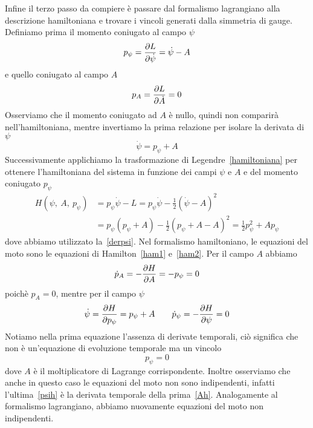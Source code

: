    Infine il terzo passo da compiere è passare dal formalismo lagrangiano alla descrizione hamiltoniana e trovare i vincoli generati dalla simmetria di gauge. Definiamo prima il momento coniugato al campo $\psi$
    \begin{equation*}
        p_\psi = \frac{\partial L}{\partial\dot \psi} = \dot \psi - A
    \end{equation*}
    e quello coniugato al campo $A$
    \begin{equation*}
        p_A = \frac{\partial L}{\partial\dot A} = 0
    \end{equation*}
    Osserviamo che il momento coniugato ad $A$ è nullo, quindi non comparirà nell'hamiltoniana, mentre invertiamo la prima relazione per isolare la derivata di $\psi$
    \begin{equation} \label{derpsi}
        \dot \psi = p_\psi + A
    \end{equation}
    Successivamente applichiamo la trasformazione di Legendre~\eqref{hamiltoniana} per ottenere l'hamiltoniana del sistema in funzione dei campi $\psi$ e $A$ e del momento coniugato $p_\psi$ 
    \begin{equation*}
    \begin{aligned}
        H(\psi,~A,~p_\psi) & = p_\psi \dot \psi - L = p_\psi \dot \psi - \frac{1}{2} {(\dot \psi - A)}^2 \\ & = p_\psi (p_\psi + A) - \frac{1}{2} {(p_\psi + A - A)}^2 = \frac{1}{2} p^2_\psi  + A p_\psi
    \end{aligned}
    \end{equation*}
    dove abbiamo utilizzato la~\eqref{derpsi}. Nel formalismo hamiltoniano, le equazioni del moto sono le equazioni di Hamilton~\eqref{ham1} e~\eqref{ham2}. Per il campo $A$ abbiamo
    \begin{equation} \label{Ah}
        \dot p_A = - \frac{\partial H}{\partial A} = - p_\psi = 0
    \end{equation}
    poichè $p_A = 0$, mentre per il campo $\psi$
    \begin{equation} \label{psih}
        \dot \psi = \frac{\partial H}{\partial p_\psi} = p_\psi + A \qquad \dot p_\psi = - \frac{\partial H}{\partial\psi} = 0
    \end{equation}
    Notiamo nella prima equazione l'assenza di derivate temporali, ciò significa che non è un'equazione di evoluzione temporale ma un vincolo
    \begin{equation*}
        p_\psi = 0
    \end{equation*}
    dove $A$ è il moltiplicatore di Lagrange corrispondente. Inoltre osserviamo che anche in questo caso le equazioni del moto non sono indipendenti, infatti l'ultima~\eqref{psih} è la derivata temporale della prima~\eqref{Ah}. Analogamente al formalismo lagrangiano, abbiamo nuovamente equazioni del moto non indipendenti.

